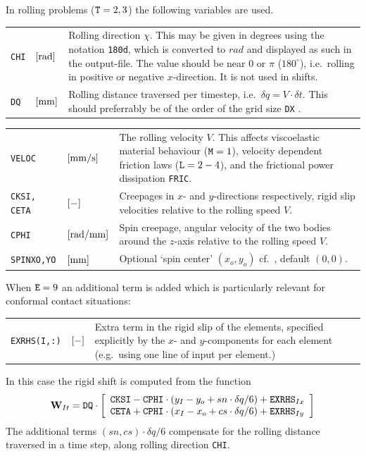 \documentclass[12pt]{report}
\newenvironment{inputvars}{\vspace{0.4\baselineskip}%

\begin{tabular}{>{\raggedright}p{22mm}p{19mm}p{113mm}}}{
\end{tabular}

}
\newcommand{\inpvar}[3]{{\small\tt #1} & $#2$ & #3 \\[1ex]}
\newcommand{\inpbreak}{\end{inputvars}\begin{inputvars}}
\begin{document}
In rolling problems (${\tt T}=2,3$) the following variables are used.
\begin{inputvars}
\inpvar{CHI}{\bunit{rad}}{Rolling direction $\chi$. This may be given in
        degrees using the notation {\tt 180d}, which is converted to
        $\unit{rad}$ and displayed as such in the output-file. The value
        should be near $0$ or $\pi$ ($180^\circ$), i.e.\ rolling in
        positive or negative $x$-direction. It is not used in shifts.}
\inpvar{DQ}{\bunit{mm}}{Rolling distance traversed per timestep, i.e.\
        $\delta q=V\cdot\delta t$. This should preferrably be of the
        order of the grid size {\tt DX} \cite{Wekken2017a-wiggles}.}
\inpbreak
\inpvar{VELOC}{\bunit{mm/s}}{The rolling velocity $V$. This affects
        viscoelastic material behaviour (${\tt M}=1$), velocity dependent
        friction laws (${\tt L}=2-4$), and the frictional power dissipation
        {\tt FRIC}.}
\inpvar{CKSI, CETA}{\bunit{-}}{Creepages in $x$- and $y$-directions
        respectively, rigid slip velocities relative to the rolling speed
        $V$.}
\inpvar{CPHI}{\bunit{rad/mm}}{Spin creepage, angular velocity of the two
        bodies around the $z$-axis relative to the rolling speed $V$.}
\inpvar{SPINXO,YO}{\bunit{mm}}{Optional `spin center' $(x_o,y_o)$ cf.\
        \cite{Vollebregt2018a-sdec}, default $(0,0)$.}
\end{inputvars}
When ${\tt E}=9$ an additional term is added which is particularly relevant
for conformal contact situations:
\begin{inputvars}
\inpvar{EXRHS(I,:)}{\bunit{-}}{Extra term in the rigid slip of the elements,
        specified explicitly by the $x$- and $y$-components for each
        element (e.g.\ using one line of input per element.)}
\end{inputvars}
In this case the rigid shift is computed from the function
\begin{equation}\label{eq:rig_shift_roll}
 \vec{W}_{It} = {\tt DQ} \cdot \left[
        \begin{array}{l}
        {\tt CKSI} - {\tt CPHI} \cdot (y_I-y_o+sn\cdot\delta q/6)
                + {\tt EXRHS}_{Ix}  \\
        {\tt CETA} + {\tt CPHI} \cdot (x_I-x_o+cs\cdot\delta q/6)
                + {\tt EXRHS}_{Iy}
        \end{array} \right]
\end{equation}
The additional terms $(sn,cs)\cdot\delta q/6$ compensate for the rolling
distance traversed in a time step, along rolling direction {\tt CHI}.
\end{document}

